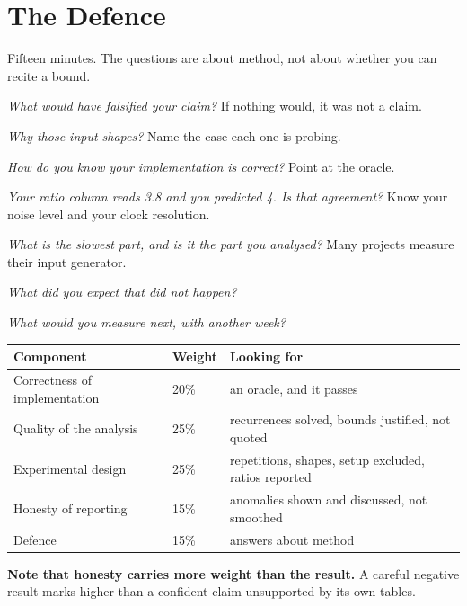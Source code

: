 \section{The Defence}

\begin{conceptbox}
Fifteen minutes. The questions are about method, not about whether you can
recite a bound.

\begin{tightnum}
  \item \emph{What would have falsified your claim?} If nothing would, it was
        not a claim.
  \item \emph{Why those input shapes?} Name the case each one is probing.
  \item \emph{How do you know your implementation is correct?} Point at the
        oracle.
  \item \emph{Your ratio column reads 3.8 and you predicted 4. Is that
        agreement?} Know your noise level and your clock resolution.
  \item \emph{What is the slowest part, and is it the part you analysed?} Many
        projects measure their input generator.
  \item \emph{What did you expect that did not happen?}
  \item \emph{What would you measure next, with another week?}
\end{tightnum}
\end{conceptbox}

\begin{conceptbox}[Marking]
\begin{longtable}{@{}L{5.4cm}L{1.6cm}L{7.0cm}@{}}
\toprule
{}
\textbf{Component} & \textbf{Weight} & \textbf{Looking for} \\
\midrule
\endhead
Correctness of implementation & 20\% & an oracle, and it passes \\
Quality of the analysis & 25\% & recurrences solved, bounds justified, not
  quoted \\
Experimental design & 25\% & repetitions, shapes, setup excluded, ratios
  reported \\
Honesty of reporting & 15\% & anomalies shown and discussed, not smoothed \\
Defence & 15\% & answers about method \\
\bottomrule
\end{longtable}

\smallskip
\textbf{Note that honesty carries more weight than the result.} A careful
negative result marks higher than a confident claim unsupported by its own
tables.
\end{conceptbox}


